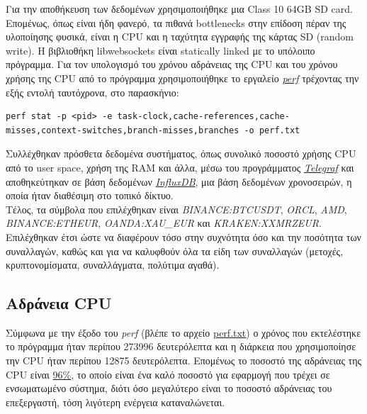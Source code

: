 \documentclass[11pt]{article}
\begin{document}
Για την αποθήκευση των δεδομένων χρησιμοποιήθηκε μια Class 10 64GB SD card. Επομένως, όπως είναι ήδη φανερό, τα πιθανά bottlenecks στην επίδοση πέραν της υλοποίησης φυσικά, είναι η CPU και η ταχύτητα εγγραφής της κάρτας SD (random write). Η βιβλιοθήκη libwebsockets είναι statically linked με το υπόλοιπο πρόγραμμα. Για τον υπολογισμό του χρόνου αδράνειας της CPU και του χρόνου χρήσης της CPU από το πρόγραμμα χρησιμοποιήθηκε το εργαλείο \emph{\href{https://perf.wiki.kernel.org/index.php/Main\_Page}{perf}} τρέχοντας την εξής εντολή ταυτόχρονα, στο παρασκήνιο:

\begin{verbatim}
perf stat -p <pid> -e task-clock,cache-references,cache-misses,context-switches,branch-misses,branches -o perf.txt
\end{verbatim}


Συλλέχθηκαν πρόσθετα δεδομένα συστήματος, όπως συνολικό ποσοστό χρήσης CPU από το user space, χρήση της RAM και άλλα, μέσω του προγράμματος \href{https://www.influxdata.com/time-series-platform/telegraf/}{\emph{Telegraf}} και αποθηκεύτηκαν σε βάση δεδομένων \href{https://www.influxdata.com}{\emph{InfluxDB}}, μια βάση δεδομένων χρονοσειρών, η οποία ήταν διαθέσιμη στο τοπικό δίκτυο. \\

Τέλος, τα σύμβολα που επιλέχθηκαν είναι \emph{BINANCE:BTCUSDT}, \emph{ORCL}, \emph{AMD}, \emph{BINANCE:ETHEUR}, \emph{OANDA:XAU\_EUR} και \emph{KRAKEN:XXMRZEUR}. Επιλέχθηκαν έτσι ώστε να διαφέρουν τόσο στην συχνότητα όσο και την ποσότητα των συναλλαγών, καθώς και για να καλυφθούν όλα τα είδη των συναλλαγών (μετοχές, κρυπτονομίσματα, συναλλάγματα, πολύτιμα αγαθά).

\pagebreak
\subsection{Αδράνεια CPU}
\label{sec:orga84b55c}
Σύμφωνα με την έξοδο του \emph{perf} (βλέπε το αρχείο \href{https://github.com/thetonk/tradestats/blob/main/report/perf.txt}{perf.txt}) ο χρόνος που εκτελέστηκε το πρόγραμμα ήταν περίπου 273996 δευτερόλεπτα και η διάρκεια που χρησιμοποίησε την CPU ήταν περίπου 12875 δευτερόλεπτα. Επομένως το ποσοστό της αδράνειας της CPU είναι \uline{96\%}, το οποίο είναι ένα καλό ποσοστό για εφαρμογή που τρέχει σε ενσωματωμένο σύστημα, διότι όσο μεγαλύτερο είναι το ποσοστό αδράνειας του επεξεργαστή, τόση λιγότερη ενέργεια καταναλώνεται\autocite{inproceedings:power-usage}.
\end{document}
